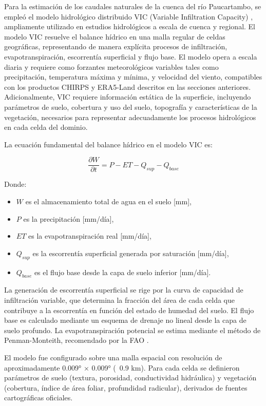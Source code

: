 Para la estimación de los caudales naturales de la cuenca del río Paucartambo,
se empleó el modelo hidrológico distribuido VIC (Variable Infiltration
Capacity) \parencite{liang1994simple}, ampliamente utilizado en estudios
hidrológicos a escala de cuenca y regional. El modelo VIC resuelve el balance
hídrico en una malla regular de celdas geográficas, representando de manera
explícita procesos de infiltración, evapotranspiración, escorrentía superficial
y flujo base. El modelo opera a escala diaria y requiere como forzantes
meteorológicos variables tales como precipitación, temperatura máxima y mínima,
y velocidad del viento, compatibles con los productos CHIRPS y ERA5-Land
descritos en las secciones anteriores. Adicionalmente, VIC requiere información
estática de la superficie, incluyendo parámetros de suelo, cobertura y uso del
suelo, topografía y características de la vegetación, necesarios para
representar adecuadamente los procesos hidrológicos en cada celda del dominio.

La ecuación fundamental del balance hídrico en el modelo VIC es:

\[
\frac{\partial W}{\partial t} = P - ET - Q_{sup} - Q_{base}
\]

Donde:

\begin{itemize}
    \item $W$ es el almacenamiento total de agua en el suelo [mm],
    \item $P$ es la precipitación [mm/día],
    \item $ET$ es la evapotranspiración real [mm/día],
    \item $Q_{sup}$ es la escorrentía superficial generada por saturación
    [mm/día],
    \item $Q_{base}$ es el flujo base desde la capa de suelo inferior [mm/día].
\end{itemize}

La generación de escorrentía superficial se rige por la curva de capacidad de
infiltración variable, que determina la fracción del área de cada celda que
contribuye a la escorrentía en función del estado de humedad del suelo. El flujo
base es calculado mediante un esquema de drenaje no lineal desde la capa de
suelo profundo. La evapotranspiración potencial se estima mediante el método de
Penman-Monteith, recomendado por la FAO \parencite{allen1998crop}.

El modelo fue configurado sobre una malla espacial con resolución de
aproximadamente 0.009° × 0.009° (~0.9 km). Para cada celda se definieron
parámetros de suelo (textura, porosidad, conductividad hidráulica) y vegetación
(cobertura, índice de área foliar, profundidad radicular), derivados de fuentes
cartográficas oficiales.

